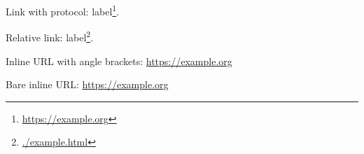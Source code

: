 Link with protocol: label\footnote{\url{https://example.org}}.

Relative link: label\footnote{\url{./example.html}}.

Inline URL with angle brackets: \url{https://example.org}

Bare inline URL: \url{https://example.org}

